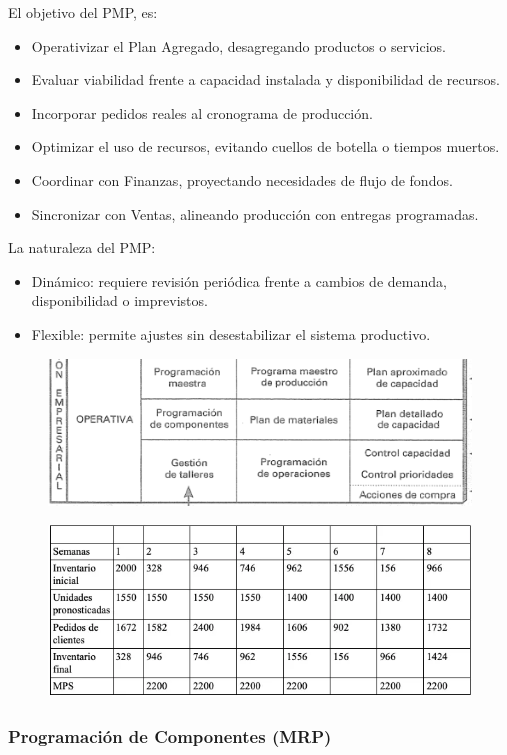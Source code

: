 \documentclass[a4paper,oneside,11pt]{article}
\begin{document}
El objetivo del PMP, es:
\begin{itemize}
    \item Operativizar el Plan Agregado, desagregando productos o servicios.
    \item Evaluar viabilidad frente a capacidad instalada y disponibilidad de recursos.
    \item Incorporar pedidos reales al cronograma de producción.
    \item Optimizar el uso de recursos, evitando cuellos de botella o tiempos muertos.
    \item Coordinar con Finanzas, proyectando necesidades de flujo de fondos.
    \item Sincronizar con Ventas, alineando producción con entregas programadas.
\end{itemize}

La naturaleza del PMP:
\begin{itemize}
    \item Dinámico: requiere revisión periódica frente a cambios de demanda, disponibilidad o imprevistos.
    \item Flexible: permite ajustes sin desestabilizar el sistema productivo.
\end{itemize}

\begin{figure} [ht!]
    \centering
    \includegraphics[width=0.5\linewidth]{pmpcuadro.png}
\end{figure}


\begin{figure} [ht!]
    \centering
    \includegraphics[width=0.75\linewidth]{pmpej.png}
\end{figure}



\clearpage
\subsubsection{Programación de Componentes (MRP)}
\end{document}
